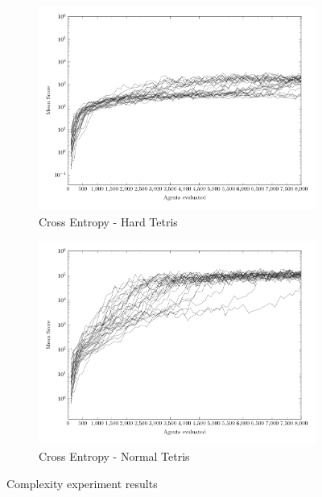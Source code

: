 \begin{figure}
\begin{subfigure}[b]{0.49\textwidth}
    	\caption{Cross Entropy - Hard Tetris}
        \includegraphics[width=\textwidth]{data/complexity/ce_hard/PlotFile.pdf}
    \end{subfigure}
    \begin{subfigure}[b]{0.49\textwidth}
    	\caption{Cross Entropy - Normal Tetris}
        \includegraphics[width=\textwidth]{data/complexity/ce_normal/PlotFile.pdf}
    \end{subfigure}
    
    \caption{Complexity experiment results}
\end{figure}


